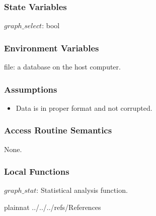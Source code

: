 \documentclass[12pt, titlepage]{article}
\begin{document}
\subsubsection{State Variables}

$graph\_select$: bool

\subsubsection{Environment Variables}

file: a database on the host computer.

\subsubsection{Assumptions}

\begin{itemize}
\item Data is in proper format and not corrupted.
\end{itemize}

\subsubsection{Access Routine Semantics}

None.

\subsubsection{Local Functions}

$graph\_stat$: Statistical analysis function.

\newpage






 {plainnat}
 {../../../refs/References}
\end{document}
